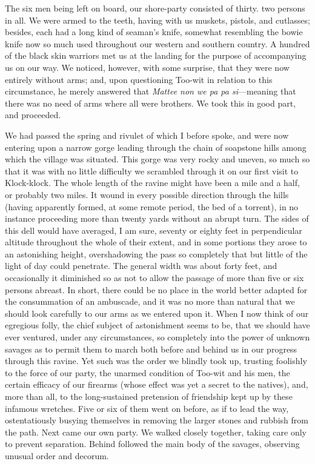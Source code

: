 The six men being left on board, our shore-party consisted of thirty. two
persons in all. We were armed to the teeth, having with us muskets, pistols, and
cutlasses; besides, each had a long kind of seaman's knife, somewhat resembling
the bowie knife now so much used throughout our western and southern country. A
hundred of the black skin warriors met us at the landing for the purpose of
accompanying us on our way. We noticed, however, with some surprise, that they
were now entirely without arms; and, upon questioning Too-wit in relation to
this circumstance, he merely answered that \emph{Mattee non we pa pa
si}---meaning that there was no need of arms where all were brothers. We took
this in good part, and proceeded. 

We had passed the spring and rivulet of which I before spoke, and were now
entering upon a narrow gorge leading through the chain of soapstone hills among
which the village was situated. This gorge was very rocky and uneven, so much so
that it was with no little difficulty we scrambled through it on our first visit
to Klock-klock. The whole length of the ravine might have been a mile and a
half, or probably two miles. It wound in every possible direction through the
hills (having apparently formed, at some remote period, the bed of a torrent),
in no instance proceeding more than twenty yards without an abrupt turn. The
sides of this dell would have averaged, I am sure, seventy or eighty feet in
perpendicular altitude throughout the whole of their extent, and in some
portions they arose to an astonishing height, overshadowing the pass so
completely that but little of the light of day could penetrate. The general
width was about forty feet, and occasionally it diminished so as not to allow
the passage of more than five or six persons abreast. In short, there could be
no place in the world better adapted for the consummation of an ambuscade, and
it was no more than natural that we should look carefully to our arms as we
entered upon it. When I now think of our egregious folly, the chief subject of
astonishment seems to be, that we should have ever ventured, under any
circumstances, so completely into the power of unknown savages as to permit them
to march both before and behind us in our progress through this ravine. Yet such
was the order we blindly took up, trusting foolishly to the force of our party,
the unarmed condition of Too-wit and his men, the certain efficacy of our
firearms (whose effect was yet a secret to the natives), and, more than all, to
the long-sustained pretension of friendship kept up by these infamous wretches.
Five or six of them went on before, as if to lead the way, ostentatiously
busying themselves in removing the larger stones and rubbish from the path. Next
came our own party. We walked closely together, taking care only to prevent
separation. Behind followed the main body of the savages, observing unusual
order and decorum. 

